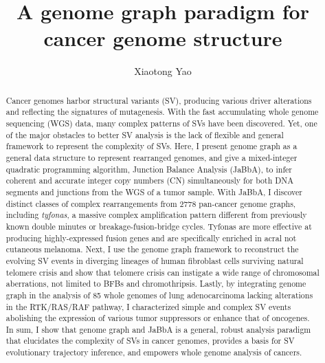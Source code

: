 \documentclass[phd,tocprelim]{cornell}
\title{A genome graph paradigm for cancer genome structure}
\author {Xiaotong Yao}
\begin{document}
\maketitle
\makecopyright

\begin{abstract}
    Cancer genomes harbor structural variants (SV), producing various driver alterations and reflecting the signatures of mutagenesis. With the fast accumulating whole genome sequencing (WGS) data, many complex patterns of SVs have been discovered. Yet, one of the major obstacles to better SV analysis is the lack of flexible and general framework to represent the complexity of SVs. Here, I present genome graph as a general data structure to represent rearranged genomes, and give a mixed-integer quadratic programming algorithm, Junction Balance Analysis (JaBbA), to infer coherent and accurate integer copy numbers (CN) simultaneously for both DNA segments and junctions from the WGS of a tumor sample. With JaBbA, I discover distinct classes of complex rearrangements from 2778 pan-cancer genome graphs, including \textit{tyfonas}, a massive complex amplification pattern different from previously known double minutes or breakage-fusion-bridge cycles. Tyfonas are more effective at producing highly-expressed fusion genes and are specifically enriched in acral not cutaneous melanoma. Next, I use the genome graph framework to reconstruct the evolving SV events in diverging lineages of human fibroblast cells surviving natural telomere crisis and show that telomere crisis can instigate a wide range of chromosomal aberrations, not limited to BFBs and chromothripsis. Lastly, by integrating genome graph in the analysis of 85 whole genomes of lung adenocarcinoma lacking alterations in the RTK/RAS/RAF pathway, I characterized simple and complex SV events abolishing the expression of various tumor suppressors or enhance that of oncogenes. In sum, I show that genome graph and JaBbA is a general, robust analysis paradigm that elucidates the complexity of SVs in cancer genomes, provides a basis for SV evolutionary trajectory inference, and empowers whole genome analysis of cancers.

\end{abstract}
\end{document}
